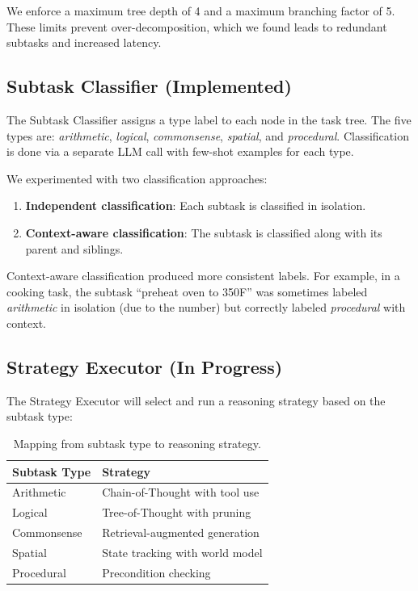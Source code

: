 \documentclass{article}
\begin{document}
We enforce a maximum tree depth of 4 and a maximum branching factor of 5. These limits prevent over-decomposition, which we found leads to redundant subtasks and increased latency.

\subsection{Subtask Classifier (Implemented)}

The Subtask Classifier assigns a type label to each node in the task tree. The five types are: \textit{arithmetic}, \textit{logical}, \textit{commonsense}, \textit{spatial}, and \textit{procedural}. Classification is done via a separate LLM call with few-shot examples for each type.

We experimented with two classification approaches:

\begin{enumerate}
    \item \textbf{Independent classification}: Each subtask is classified in isolation.
    \item \textbf{Context-aware classification}: The subtask is classified along with its parent and siblings.
\end{enumerate}

Context-aware classification produced more consistent labels. For example, in a cooking task, the subtask ``preheat oven to 350F'' was sometimes labeled \textit{arithmetic} in isolation (due to the number) but correctly labeled \textit{procedural} with context.

\subsection{Strategy Executor (In Progress)}

The Strategy Executor will select and run a reasoning strategy based on the subtask type:

\begin{table}[h]
\centering
\begin{tabular}{ll}
\toprule
\textbf{Subtask Type} & \textbf{Strategy} \\
\midrule
Arithmetic & Chain-of-Thought with tool use \\
Logical & Tree-of-Thought with pruning \\
Commonsense & Retrieval-augmented generation \\
Spatial & State tracking with world model \\
Procedural & Precondition checking \\
\bottomrule
\end{tabular}
\caption{Mapping from subtask type to reasoning strategy.}
\label{tab:strategies}
\end{table}
\end{document}
